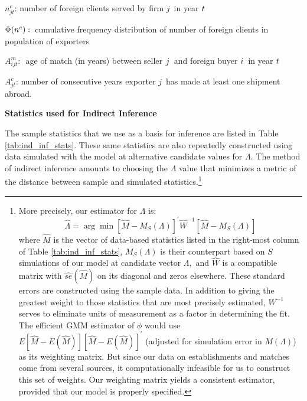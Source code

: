 \begin{table}[tbp]
$n_{jt}^{c}${\small : number of foreign clients served by firm }$j${\small \ in year }${\small t}${\small \ }

${\small \Phi }{\small (n^{c})}:${\small \ cumulative frequency distribution of number of foreign clients in population of exporters }

$A_{ijt}^{m}:${\small \ age of match (in years) between seller }${\small j}${\small \ and foreign buyer }${\small i}${\small \ in year }${\small t} ${\small \ }

$A_{jt}^{c}${\small : number of consecutive years exporter }$j${\small \ has
made at least one shipment abroad.}
\caption{\textbf{Statistics used for Indirect Inference}}
\label{tab:ind_inf_stats}
\end{table}%
\renewcommand{\arraystretch}{1}

The sample statistics that we use as a basis for inference are listed in
Table \ref{tab:ind_inf_stats}. These same statistics are also repeatedly constructed using data
simulated with the model at alternative candidate values for $\Lambda $. The
method of indirect inference amounts to choosing the $\Lambda $ value that
minimizes a metric of the distance between sample and simulated 
statistics.\footnote{More precisely, our estimator for $\Lambda $ is: 
\begin{equation*}
\widehat{\Lambda }=\arg \min \left[ \widehat{M}-M_{S}(\Lambda )\right]
^{\prime }\widehat{W}^{-1}\left[ \widehat{M}-M_{S}(\Lambda )\right]
\end{equation*}%
where $\widehat{M}$ is the vector of data-based statistics listed in the
right-most column of Table \ref{tab:ind_inf_stats}, $M_{S}(\Lambda )$ is their counterpart based
on $S$ simulations of our model at candidate vector $\Lambda ,$ and $%
\widehat{W}$ is a compatible matrix with $\widehat{se}(\widehat{M})$ on its
diagonal and zeros elsewhere. These standard errors are constructed using
the sample data. In addition to giving the greatest weight to those
statistics that are most precisely estimated, $W^{-1}$ serves to eliminate
units of measurement as a factor in determining the fit.
The efficient GMM estimator of $\phi $ would use $E\left[ \widehat{M}-E(%
\widehat{M})\right] \left[ \widehat{M}-E(\widehat{M})\right] ^{\prime }$
(adjusted for simulation error in $M(\Lambda )$) as its weighting matrix.
But since our data on establishments and matches come from several sources,
it computationally infeasible for us to construct this set of weights. Our
weighting matrix yields a consistent estimator, provided that our model is
properly specified.}


